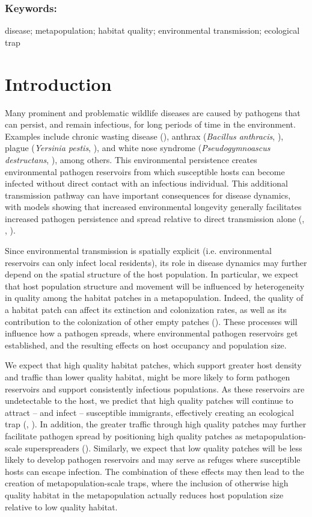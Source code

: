 \documentclass{article}
\begin{document}
\subsubsection*{Keywords:}
disease; metapopulation; habitat quality; environmental transmission; ecological trap

\section{Introduction}
\label{intro}

Many prominent and problematic wildlife diseases are caused by pathogens that can persist, and remain infectious, for long periods of time in the environment.  Examples include chronic wasting disease (\cite{Miller2006}), anthrax (\emph{Bacillus anthracis}, \cite{Dragon1995}), plague (\emph{Yersinia pestis}, \cite{Eisen2008}), and white nose syndrome (\emph{Pseudogymnoascus destructans}, \cite{Reynolds2015}), among others.  This environmental persistence creates environmental pathogen reservoirs from which susceptible hosts can become infected without direct contact with an infectious individual.  This additional transmission pathway can have important consequences for disease dynamics, with models showing that increased environmental longevity generally facilitates increased pathogen persistence and spread relative to direct transmission alone (\cite{Almberg2011}, \cite{Sharp2011}, \cite{Breban2009}). 

Since environmental transmission is spatially explicit (i.e. environmental reservoirs can only infect local residents), its role in disease dynamics may further depend on the spatial structure of the host population.  In particular, we expect that host population structure and movement will be influenced by heterogeneity in quality among the habitat patches in a metapopulation.  Indeed, the quality of a habitat patch can affect its extinction and colonization rates, as well as its contribution to the colonization of other empty patches (\cite{Moilanen1998}).  These processes will influence how a pathogen spreads, where environmental pathogen reservoirs get established, and the resulting effects on host occupancy and population size.  

We expect that high quality habitat patches, which support greater host density and traffic than lower quality habitat, might be more likely to form pathogen reservoirs and support consistently infectious populations.  As these reservoirs are undetectable to the host, we predict that high quality patches will continue to attract -- and infect -- susceptible immigrants, effectively creating an ecological trap (\cite{Robertson2006}, \cite{Almberg2011}).  In addition, the greater traffic through high quality patches may further facilitate pathogen spread by positioning high quality patches as metapopulation-scale superspreaders (\cite{Paull2012}).  Similarly, we expect that low quality patches will be less likely to develop pathogen reservoirs and may serve as refuges where susceptible hosts can escape infection.
The combination of these effects may then lead to the creation of metapopulation-scale traps, where the inclusion of otherwise high quality habitat in the metapopulation actually reduces host population size relative to low quality habitat.
\end{document}
